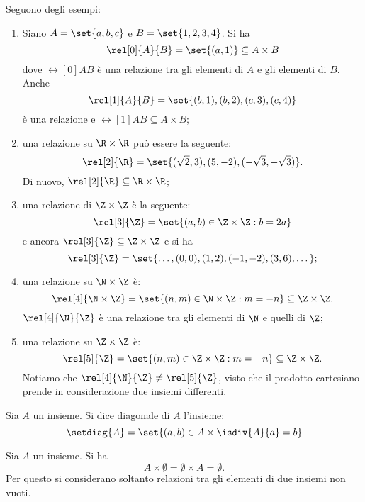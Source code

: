 \begin{examples}
    Seguono degli esempi:
    \begin{enumerate}
        \item Siano \(A = \set{a, b, c}\) e \(B = \set{1, 2, 3, 4}\). Si ha
            \[
                \rel[0]{A}{B} = \set{(a, 1)} \subseteq A \times B
            \]
            dove \(\rel[0]{A}{B}\) è una relazione tra gli elementi di \(A\) e gli elementi di \(B\). Anche
            \[
                \rel[1]{A}{B} = \set{(b, 1), (b, 2), (c, 3), (c, 4)}
            \]
            è una relazione e \(\rel[1]{A}{B} \subseteq A \times B\);
        \item una relazione su \(\R \times \R\) può essere la seguente:
            \[
                \rel[2]{\R} = \set{(\sqrt{2}, 3), (5, -2), (-\sqrt{3}, -\sqrt{3})}.
            \]
            Di nuovo, \(\rel[2]{\R} \subseteq \R \times \R\);
        \item una relazione di \(\Z \times \Z\) è la seguente:
            \[
                \rel[3]{\Z} = \set{(a, b) \in \Z \times \Z : b = 2a}
            \]
            e ancora \(\rel[3]{\Z} \subseteq \Z \times \Z\) e si ha
            \[
                \rel[3]{\Z} = \set{\dotsc, (0, 0), (1, 2), (-1, -2), (3, 6), \dotsc};
            \]
        \item una relazione su \(\N \times \Z\) è:
            \[
                \rel[4]{\N \times \Z} = \set{(n, m) \in \N \times \Z : m = -n} \subseteq \Z \times \Z.
            \]
            \(\rel[4]{\N}{\Z}\) è una relazione tra gli elementi di \(\N\) e quelli di \(\Z\);
        \item una relazione su \(\Z \times \Z\) è:
            \[
                \rel[5]{\Z} = \set{(n, m) \in \Z \times \Z : m = -n} \subseteq \Z \times \Z.
            \]
            Notiamo che \(\rel[4]{\N}{\Z} \neq \rel[5]{\Z}\), visto che il prodotto cartesiano prende in considerazione due insiemi differenti.
    \end{enumerate}
\end{examples}

\begin{example}
    Sia \(A\) un insieme. Si dice diagonale di \(A\) l'insieme:
    \[
        \setdiag{A} = \set{(a, b) \in A \times \isdiv{A}{a} = b}
    \]
\end{example}

\begin{remark}
    Sia \(A\) un insieme. Si ha
    \[
        A \times \emptyset = \emptyset \times A = \emptyset.
    \]
    Per questo si considerano soltanto relazioni tra gli elementi di due insiemi non vuoti.
\end{remark}


